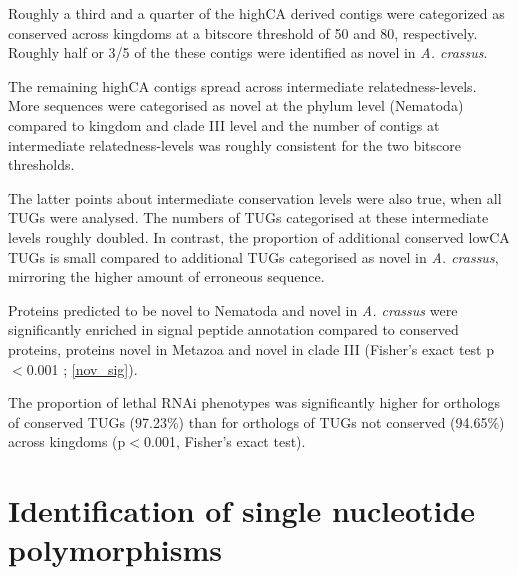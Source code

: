 \afterpage{\clearpage}

Roughly a third and a quarter of the highCA derived contigs were
categorized as conserved across kingdoms at a bitscore threshold of 50
and 80, respectively. Roughly half or 3/5 of the these contigs were
identified as novel in \textit{A. crassus}.

The remaining highCA contigs spread across intermediate
relatedness-levels. More sequences were categorised as novel at the
phylum level (Nematoda) compared to kingdom and clade III level and
the number of contigs at intermediate relatedness-levels was roughly
consistent for the two bitscore thresholds.

The latter points about intermediate conservation levels were also
true, when all TUGs were analysed. The numbers of TUGs categorised at
these intermediate levels roughly doubled. In contrast, the proportion
of additional conserved lowCA TUGs is small compared to additional
TUGs categorised as novel in \textit{A. crassus}, mirroring the higher
amount of erroneous sequence.

Proteins predicted to be novel to Nematoda and novel in
\textit{A. crassus} were significantly enriched in signal peptide
annotation compared to conserved proteins, proteins novel in Metazoa
and novel in clade III (Fisher's exact test p$<$0.001 ;
\ref{nov_sig}).


The proportion of lethal RNAi phenotypes was significantly higher for
orthologs of conserved TUGs (97.23\%) than for orthologs of TUGs not
conserved (94.65\%) across kingdoms (p$<$0.001, Fisher's exact test).

\section{Identification of single nucleotide polymorphisms}

